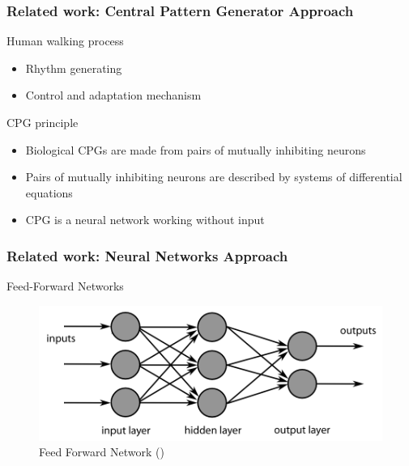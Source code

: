 \documentclass{beamer}
\begin{document}

	\begin{frame}
		\frametitle{Related work: Central Pattern Generator Approach}
		\begin{block}{Human walking process}
			\begin{itemize}
				\item
					Rhythm generating
				\item
					Control and adaptation mechanism
					
			\end{itemize}
		\end{block}
		\begin{block}{CPG principle}
			\begin{itemize}
				\item
					Biological CPGs are made from pairs of mutually inhibiting neurons
				\item
					Pairs of mutually inhibiting neurons are described by systems of differential equations
				\item
					CPG is a neural network working without input
			\end{itemize}
		\end{block}
	\end{frame}


	\begin{frame}
		\frametitle{Related work: Neural Networks Approach}
		\centering
		Feed-Forward Networks
		
		\begin{figure}[h!]
			\begin{minipage}[H]{\linewidth}
				\centering
				\includegraphics[width=\linewidth]{presentation_images/9}
				\caption{Feed Forward Network (\cite{kim2012zmp})}
			\end{minipage}
		\end{figure}
	\end{frame}
\end{document}
